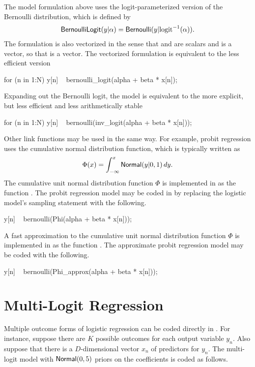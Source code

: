 The model formulation above uses the logit-parameterized version of
the Bernoulli distribution, which is defined by 
%
\[
\distro{BernoulliLogit}(y|\alpha) 
=
\distro{Bernoulli}(y | \mbox{logit}^{-1}(\alpha)).
\]
%
The formulation is also vectorized in the sense that  and
 are scalars and  is a vector, so that  is a vector.  The vectorized formulation is equivalent
to the less efficient version
%

\begin{stancode}
for (n in 1:N)
  y[n] ~ bernoulli_logit(alpha + beta * x[n]);
\end{stancode}
%
Expanding out the Bernoulli logit, the model is equivalent to the more
explicit, but less efficient and less arithmetically stable
%

\begin{stancode}
for (n in 1:N)
  y[n] ~ bernoulli(inv_logit(alpha + beta * x[n]));
\end{stancode}

Other link functions may be used in the same way.  For example, probit
regression uses the cumulative normal distribution function, which is
typically written as 
\[
\Phi(x) = \int_{-\infty}^x \distro{Normal}(y|0,1) \, dy.
\]
%
The cumulative unit normal distribution function $\Phi$ is implemented
in \Stan as the function .  The probit regression model
may be coded in \Stan by replacing the logistic model's sampling
statement with the following.
%

\begin{stancode}
        y[n] ~ bernoulli(Phi(alpha + beta * x[n]));
\end{stancode}
%
A fast approximation to the cumulative unit normal distribution function 
$\Phi$ is implemented in \Stan as the function .  The 
approximate probit regression model may be coded with the following.
%

\begin{stancode}
        y[n] ~ bernoulli(Phi_approx(alpha + beta * x[n]));
\end{stancode}

\section{Multi-Logit Regression}\label{multi-logit.section}

Multiple outcome forms of logistic regression can be coded directly in
\Stan.  For instance, suppose there are $K$ possible outcomes for each
output variable $y_n$.  Also suppose that there is a $D$-dimensional
vector $x_n$ of predictors for $y_n$.  The multi-logit model with
$\distro{Normal}(0,5)$ priors on the coefficients is coded as follows.
%

